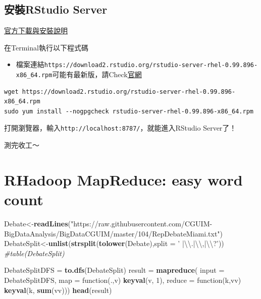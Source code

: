 \documentclass[]{book}
\newenvironment{Shaded}{\begin{snugshade}}{\end{snugshade}}
\newcommand{\KeywordTok}[1]{\textcolor[rgb]{0.13,0.29,0.53}{\textbf{{#1}}}}
\newcommand{\DataTypeTok}[1]{\textcolor[rgb]{0.13,0.29,0.53}{{#1}}}
\newcommand{\DecValTok}[1]{\textcolor[rgb]{0.00,0.00,0.81}{{#1}}}
\newcommand{\CharTok}[1]{\textcolor[rgb]{0.31,0.60,0.02}{{#1}}}
\newcommand{\StringTok}[1]{\textcolor[rgb]{0.31,0.60,0.02}{{#1}}}
\newcommand{\CommentTok}[1]{\textcolor[rgb]{0.56,0.35,0.01}{\textit{{#1}}}}
\newcommand{\NormalTok}[1]{{#1}}
\providecommand{\tightlist}{%
  \setlength{\itemsep}{0pt}\setlength{\parskip}{0pt}}
\theoremstyle{definition}
\theoremstyle{definition}
\theoremstyle{remark}
\begin{document}
\subsection{安裝RStudio Server}\label{rstudio-server}

\href{https://www.rstudio.com/products/rstudio/download-server/}{官方下載與安裝說明}

在Terminal執行以下程式碼

\begin{itemize}
\tightlist
\item
  檔案連結\texttt{https://download2.rstudio.org/rstudio-server-rhel-0.99.896-x86\_64.rpm}可能有最新版，請Check\href{https://www.rstudio.com/products/rstudio/download-server/}{官網}
\end{itemize}

\begin{verbatim}
wget https://download2.rstudio.org/rstudio-server-rhel-0.99.896-x86_64.rpm
sudo yum install --nogpgcheck rstudio-server-rhel-0.99.896-x86_64.rpm
\end{verbatim}

打開瀏覽器，輸入\texttt{http://localhost:8787/}，就能進入RStudio
Server了！

測完收工～

\section{RHadoop MapReduce: easy word
count}\label{rhadoop-mapreduce-easy-word-count}

\begin{Shaded}
\begin{Highlighting}[]
\NormalTok{Debate<-}\KeywordTok{readLines}\NormalTok{(}\StringTok{"https://raw.githubusercontent.com/CGUIM-BigDataAnalysis/BigDataCGUIM/master/104/RepDebateMiami.txt"}\NormalTok{)}
\NormalTok{DebateSplit<-}\KeywordTok{unlist}\NormalTok{(}\KeywordTok{strsplit}\NormalTok{(}\KeywordTok{tolower}\NormalTok{(Debate),}\DataTypeTok{split =} \StringTok{' |}\CharTok{\textbackslash{}\textbackslash{}}\StringTok{.|}\CharTok{\textbackslash{}\textbackslash{}}\StringTok{,|}\CharTok{\textbackslash{}\textbackslash{}}\StringTok{?'}\NormalTok{))}
\CommentTok{#table(DebateSplit)}
\end{Highlighting}
\end{Shaded}

\begin{Shaded}
\begin{Highlighting}[]
\NormalTok{DebateSplitDFS =}\StringTok{ }\KeywordTok{to.dfs}\NormalTok{(DebateSplit)}
\NormalTok{result =}\StringTok{ }\KeywordTok{mapreduce}\NormalTok{(}
    \DataTypeTok{input =} \NormalTok{DebateSplitDFS,}
    \DataTypeTok{map =} \NormalTok{function(.,v) }\KeywordTok{keyval}\NormalTok{(v, }\DecValTok{1}\NormalTok{),}
    \DataTypeTok{reduce =} \NormalTok{function(k,vv) }\KeywordTok{keyval}\NormalTok{(k, }\KeywordTok{sum}\NormalTok{(vv)))}
\KeywordTok{head}\NormalTok{(result)}
\end{Highlighting}
\end{Shaded}
\end{document}
